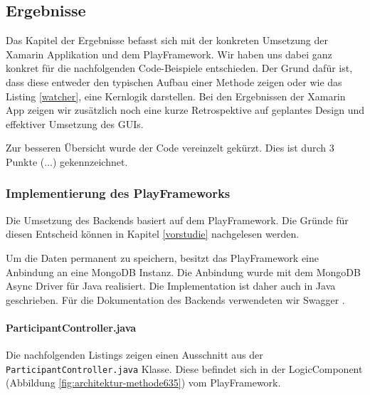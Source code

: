 \subsection{Ergebnisse}
Das Kapitel der Ergebnisse befasst sich mit der konkreten Umsetzung der Xamarin Applikation und dem PlayFramework. Wir haben uns dabei ganz konkret für die nachfolgenden Code-Beispiele entschieden. Der Grund dafür ist, dass diese entweder den typischen Aufbau einer Methode zeigen oder wie das Listing \ref{watcher}, eine Kernlogik darstellen. 
Bei den Ergebnissen der Xamarin App zeigen wir zusätzlich noch eine kurze Retrospektive auf geplantes Design und effektiver Umsetzung des GUIs.

Zur besseren Übersicht wurde der Code vereinzelt gekürzt. Dies ist durch 3 Punkte (...) gekennzeichnet.

\subsubsection{Implementierung des PlayFrameworks}
Die Umsetzung des Backends basiert auf dem PlayFramework. Die Gründe für diesen Entscheid können in Kapitel \ref{vorstudie} nachgelesen werden. 

Um die Daten permanent zu speichern, besitzt das PlayFramework eine Anbindung an eine MongoDB Instanz. Die Anbindung wurde mit dem MongoDB Async Driver für Java \cite{MongoDBAsyncDriver} realisiert. Die Implementation ist daher auch in Java geschrieben. Für die Dokumentation des Backends verwendeten wir Swagger \cite{swagger}.

\paragraph*{ParticipantController.java}
Die nachfolgenden Listings zeigen einen Ausschnitt aus der \texttt{ParticipantController.java} Klasse. Diese befindet sich in der LogicComponent (Abbildung \ref{fig:architektur-methode635}) vom PlayFramework.

